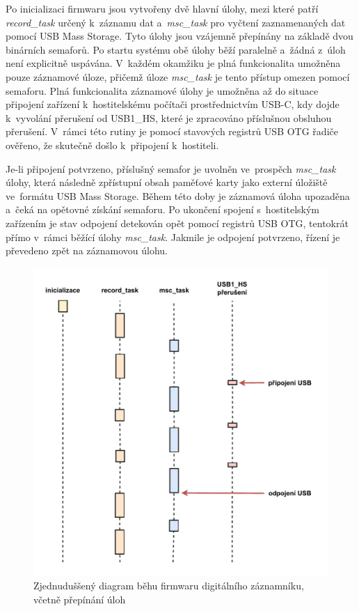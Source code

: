 Po inicializaci firmwaru jsou vytvořeny dvě hlavní úlohy, mezi které patří \textit{record\_task} určený k~záznamu dat a~\textit{msc\_task} pro vyčtení zaznamenaných dat pomocí USB Mass Storage. Tyto úlohy jsou vzájemně přepínány na základě dvou binárních semaforů. Po startu systému obě úlohy běží paralelně a~žádná z~úloh není explicitně uspávána. V~každém okamžiku je plná funkcionalita umožněna pouze záznamové úloze, přičemž úloze \textit{msc\_task} je tento přístup omezen pomocí semaforu. Plná funkcionalita záznamové úlohy je umožněna až do situace připojení zařízení k~hostitelskému počítači prostřednictvím USB-C, kdy dojde k~vyvolání přerušení od USB1\_HS, které je zpracováno příslušnou obsluhou přerušení. V~rámci této rutiny je pomocí stavových registrů USB OTG řadiče ověřeno, že skutečně došlo k~připojení k~hostiteli. 

\newpage

Je-li připojení potvrzeno, příslušný semafor je uvolněn ve~prospěch \textit{msc\_task} úlohy, která následně zpřístupní obsah paměťové karty jako externí úložiště ve~formátu USB Mass Storage. Během této doby je záznamová úloha upozaděna a~čeká na opětovné získání semaforu. Po ukončení spojení s~hostitelským zařízením je stav odpojení detekován opět pomocí registrů USB OTG, tentokrát přímo v~rámci běžící úlohy \textit{msc\_task}. Jakmile je odpojení potvrzeno, řízení je převedeno zpět na záznamovou úlohu.

\begin{figure}[h]
    \centering
    \includegraphics[width=1.00\textwidth]{obrazky-figures/run_wout_freertos-updated.pdf}
    
    \caption{Zjednuduššený diagram běhu firmwaru digitálního záznamníku, včetně přepínání úloh}
    \label{fig:application-run-freertos}
\end{figure}

